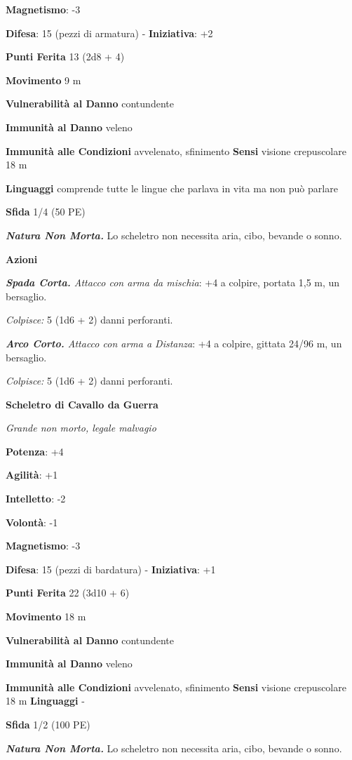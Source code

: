 \begin{multicols}{2}
\textbf{Magnetismo}: -3

\textbf{Difesa}: 15 (pezzi di armatura) - \textbf{Iniziativa}: +2

\textbf{Punti Ferita} 13 (2d8 + 4)

\textbf{Movimento} 9 m

\textbf{Vulnerabilità al Danno} contundente

\textbf{Immunità al Danno} veleno

\textbf{Immunità alle Condizioni} avvelenato, sfinimento \textbf{Sensi}
visione crepuscolare 18 m

\textbf{Linguaggi} comprende tutte le lingue che parlava in vita ma non
può parlare

\textbf{Sfida} 1/4 (50 PE)

\emph{\textbf{Natura Non Morta.}} Lo scheletro non necessita aria, cibo,
bevande o sonno.

\textbf{Azioni}

\emph{\textbf{Spada Corta.} Attacco con arma da mischia}: +4 a colpire,
portata 1,5 m, un bersaglio.

\emph{Colpisce:} 5 (1d6 + 2) danni perforanti.

\emph{\textbf{Arco Corto.} Attacco con arma a Distanza}: +4 a colpire,
gittata 24/96 m, un bersaglio.

\emph{Colpisce:} 5 (1d6 + 2) danni perforanti.

\textbf{Scheletro di Cavallo da Guerra}

\emph{Grande non morto, legale malvagio}

\textbf{Potenza}: +4

\textbf{Agilità}: +1

\textbf{Intelletto}: -2

\textbf{Volontà}: -1

\textbf{Magnetismo}: -3

\textbf{Difesa}: 15 (pezzi di bardatura) - \textbf{Iniziativa}: +1

\textbf{Punti Ferita} 22 (3d10 + 6)

\textbf{Movimento} 18 m

\textbf{Vulnerabilità al Danno} contundente

\textbf{Immunità al Danno} veleno

\textbf{Immunità alle Condizioni} avvelenato, sfinimento \textbf{Sensi}
visione crepuscolare 18 m \textbf{Linguaggi} -

\textbf{Sfida} 1/2 (100 PE)

\emph{\textbf{Natura Non Morta.}} Lo scheletro non necessita aria, cibo,
bevande o sonno.


\end{multicols}
